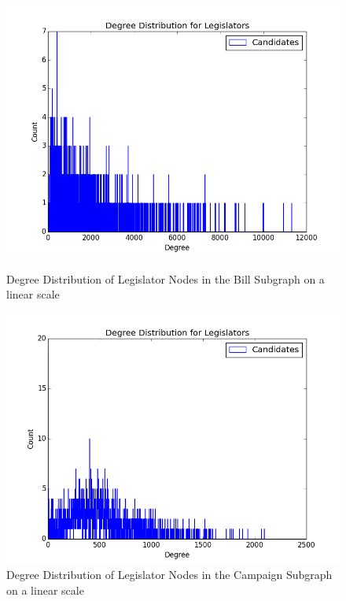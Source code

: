 \documentclass[12pt,twocolumn]{article}
\begin{document}
\begin{figure}
\centering
\begin{minipage}{0.45\linewidth}

\includegraphics[width=\linewidth]{candidate_in_bill_deg_distro}
\caption{Degree Distribution of Legislator Nodes in the Bill Subgraph on a linear scale}
\label{fig:candidate_in_bill_deg_distro}
\end{minipage}\hfill
\begin{minipage}{0.45\linewidth}

\includegraphics[width=\linewidth]{candidate_in_campaign_deg_distro}
\caption{Degree Distribution of Legislator Nodes in the Campaign Subgraph on a linear scale}
\label{fig:candidate_in_campaign_deg_distro}
 \end{minipage}
\end{figure}
\end{document}
